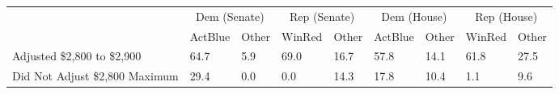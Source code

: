 \begin{tabular}{lll|ll|ll|ll}
  & \multicolumn{2}{c}{Dem (Senate)}& \multicolumn{2}{c}{Rep (Senate)}& \multicolumn{2}{c}{Dem (House)}& \multicolumn{2}{c}{Rep (House)}\\  & ActBlue & Other & WinRed & Other & ActBlue & Other & WinRed & Other \\ 
  \midrule
Adjusted \$2,800 to \$2,900 & 64.7 & 5.9 & 69.0 & 16.7 & 57.8 & 14.1 & 61.8 & 27.5 \\ 
  Did Not Adjust \$2,800 Maximum & 29.4 & 0.0 & 0.0 & 14.3 & 17.8 & 10.4 & 1.1 & 9.6 \\ 
  \end{tabular}
